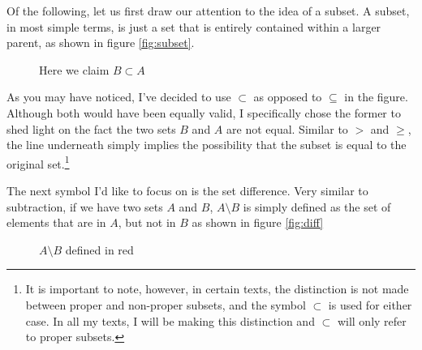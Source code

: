\documentclass[11pt]{article}
\numberwithin{lemma}{section}
\numberwithin{equation}{section}
\numberwithin{define}{section}
\numberwithin{prop}{section}
\numberwithin{figure}{section}
\numberwithin{theorem}{section}
\newcounter{ex}[section]
\numberwithin{ex}{section}
\begin{document}
Of the following, let us first draw our attention to the idea of a subset. A subset, in most simple terms, is just a set that is entirely contained within a larger parent, as shown in figure \eqref{fig:subset}. 
\begin{figure}[h]
	\centering
	\caption{Here we claim $B\subset A$}
	\label{fig:subset}
\end{figure}
As you may have noticed, I've decided to use $\subset$ as opposed to $\subseteq$ in the figure. Although both would have been equally valid, I specifically chose the former to shed light on the fact the two sets $B$ and $A$ are not equal. 
Similar to $>$ and $\ge$, the line underneath simply implies the possibility that the subset is equal to the original set.\footnote{It is important to note, however, in certain texts, the distinction is not made between proper and non-proper subsets, and the symbol $\subset$ is used for either case. In all my texts, I will be making this distinction and $\subset$ will only refer to proper subsets.}

The next symbol I'd like to focus on is the set difference. Very similar to subtraction, if we have two sets $A$ and $B$, $A\setminus B$ is simply defined as the set of elements that are in $A$, but not in $B$ as shown in figure \eqref{fig:diff}
\begin{figure}[h]
\centering
{}
	\caption{$A\setminus B$ defined in red}
	\label{fig:diff}
\end{figure}
\end{document}
